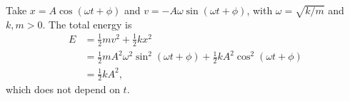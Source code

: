 Take $x = A\cos(\omega t + \phi)$ and $v = -A\omega\sin(\omega t + \phi)$, with
$\omega = \sqrt{k/m}$ and $k, m > 0$. The total energy is
\begin{align}
  E &= \frac{1}{2} m v^2 + \frac{1}{2} k x^2 \\
    &= \frac{1}{2} m A^2 \omega^2 \sin^2(\omega t + \phi)
       + \frac{1}{2} k A^2 \cos^2(\omega t + \phi) \\
    &= \frac{1}{2} k A^2 ,
\end{align}
which does not depend on $t$.
